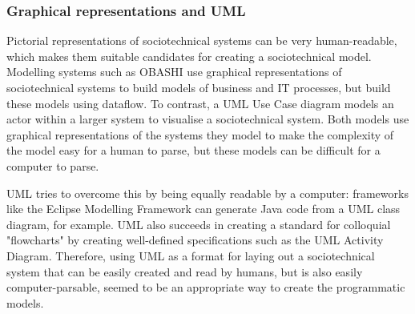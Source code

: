 \documentclass[11pt, twocolumn]{article}
\begin{document}
\subsubsection{Graphical representations and UML}
\label{pictorial}
Pictorial representations of sociotechnical systems can be very human-readable, which makes them suitable candidates for creating a sociotechnical model. Modelling systems such as OBASHI\cite{ObashiMethodology} use graphical representations of sociotechnical systems to build models of business and IT processes, but build these models using dataflow. To contrast, a UML Use Case diagram\cite{Omg2010} models an actor within a larger system to visualise a sociotechnical system. Both models use graphical representations of the systems they model to make the complexity of the model easy for a human to parse, but these models can be difficult for a computer to parse. \par
UML tries to overcome this by being equally readable by a computer: frameworks like the Eclipse Modelling Framework can generate Java code from a UML class diagram, for example\cite{EMFManual}. UML also succeeds in creating a standard for colloquial "flowcharts" by creating well-defined specifications such as the UML Activity Diagram. Therefore, using UML as a format for laying out a sociotechnical system that can be easily created and read by humans, but is also easily computer-parsable, seemed to be an appropriate way to create the programmatic models.
\end{document}
